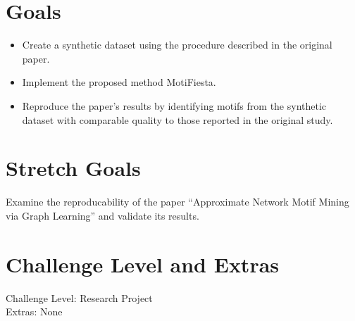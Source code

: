 \documentclass{article}
\begin{document}
\section{Goals}
\begin{itemize}
    \item Create a synthetic dataset using the procedure described in the original paper.
    \item Implement the proposed method MotiFiesta.
    \item Reproduce the paper's results by identifying motifs from the synthetic dataset with comparable quality to those reported in the original study.
\end{itemize}

\section{Stretch Goals}
Examine the reproducability of the paper ``Approximate Network Motif Mining via Graph Learning'' and validate its results.
\section{Challenge Level and Extras}
Challenge Level: Research Project \\
Extras: None
\end{document}
